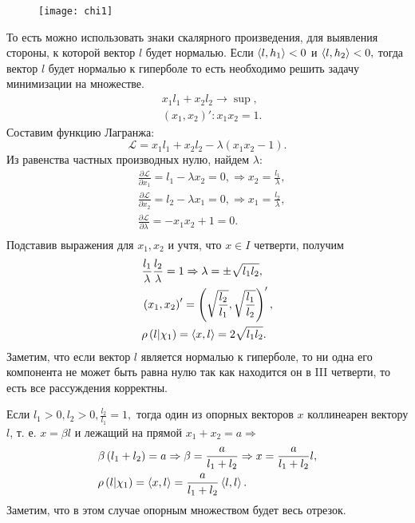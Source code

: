 \documentclass[11pt]{article}
\begin{document}
\begin{figure}[h!]
%
{\texttt{[image: chi1]}}
\end{figure}


То есть можно использовать знаки скалярного произведения, для выявления стороны, к которой вектор $l$ будет нормалью.
Если $\left<l,h_1\right> < 0$ и $\left<l,h_2\right> < 0,$ тогда вектор $l$ будет нормалью к гиперболе
то есть необходимо решить задачу минимизации на множестве. 
\[
\begin{aligned}
& x_1l_1 + x_2l_2 \rightarrow \sup,
\\
& \left(x_1, x_2\right)' : x_1 x_2 = 1.
\end{aligned}
\]
Составим функцию Лагранжа:
\[
\mathcal{L} = x_1l_1 + x_2l_2 - \lambda \left(x_1 x_2 - 1 \right).
\]
Из равенства частных производных нулю, найдем $\lambda:$
\[
\begin{aligned}
&\frac{\partial\mathcal{L}}{\partial x_1} = l_1 - \lambda x_2 = 0,
\Rightarrow x_2 = \frac{l_1}{\lambda},
\\
&\frac{\partial\mathcal{L}}{\partial x_2} = l_2 - \lambda x_1 = 0,
\Rightarrow x_1 = \frac{l_2}{\lambda},
\\
& \frac{\partial\mathcal{L}}{\partial \lambda} = -x_1 x_2 + 1 = 0.
\\
\end{aligned}
\]
Подставив выражения для $x_1, x_2$ и учтя, что $x \in I $ четверти, получим
\[
\begin{aligned}
&\frac{l_1}{\lambda} \frac{l_2}{\lambda} = 1 \Rightarrow \lambda = \pm\sqrt{l_1 l_2},
\\
&\left(x_1, x_2\right)' = \left(\sqrt{\frac{l_2}{l_1}},  \sqrt{\frac{l_1}{l_2}}\right)',
\\
&\rho\left(l | \chi_1  \right) = \left<x,l\right> = 2\sqrt{l_1 l_2}.
\end{aligned}
\]
Заметим, что если вектор $l$ является нормалью к гиперболе, то ни одна его компонента не может быть 
равна нулю так как находится он в III четверти, то есть все рассуждения корректны.

Если $l_1 > 0, l_2 > 0, \frac{l_2}{l_1} = 1,$ тогда один из опорных векторов $x$ коллинеарен
вектору $l$, т. е. $x = \beta l$ и лежащий на прямой $x_1 + x_2 = a \Rightarrow$
\[
\begin{aligned}
& \beta \left(l_1 + l_2  \right) = a \Rightarrow \beta = \frac{a}{l_1+l_2} \Rightarrow 
x = \frac{a}{l_1+l_2} l,
\\
& \rho\left(l | \chi_1  \right) = \left<x,l\right> = \frac{a}{l_1+l_2}\left<l,l\right>.
\end{aligned}
\]
Заметим, что в этом случае опорным множеством будет весь отрезок. 
\end{document}
